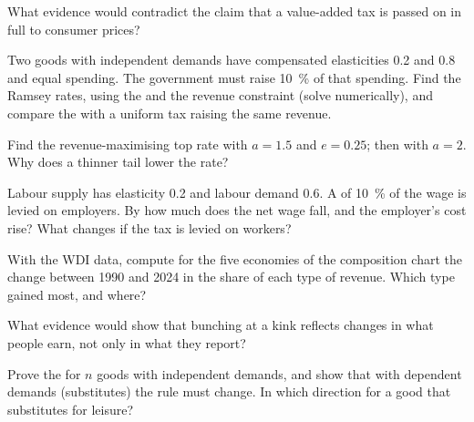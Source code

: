 \begin{exercise}[$\star$]\label{exo:b3:efficiency-cost-of-taxation:4}
What evidence would contradict the claim that a value-added tax is passed on in
full to consumer prices?
\end{exercise}

\begin{exercise}[$\star\star$]\label{exo:b3:efficiency-cost-of-taxation:5}
Two goods with independent demands have compensated elasticities 0.2 and 0.8 and
equal spending. The government must raise 10~\% of that spending. Find the
Ramsey rates, using the  and the revenue constraint
(solve numerically), and compare the  with a uniform tax raising the
same revenue.
\end{exercise}

\begin{exercise}[$\star\star$]\label{exo:b3:efficiency-cost-of-taxation:6}
Find the revenue-maximising top rate with $a = 1.5$ and $e = 0.25$; then with $a = 2$. Why
does a thinner tail lower the rate?
\end{exercise}

\begin{exercise}[$\star\star$]\label{exo:b3:efficiency-cost-of-taxation:7}
Labour supply has elasticity 0.2 and labour demand 0.6. A  of 10~\% of
the wage is levied on employers. By how much does the net wage fall, and the
employer's cost rise? What changes if the tax is levied on workers?
\end{exercise}

\begin{exercise}[$\star\star$]\label{exo:b3:efficiency-cost-of-taxation:8}
With the WDI data, compute for the five economies of the composition chart the
change between 1990 and 2024 in the share of each type of revenue. Which type gained
most, and where?
\end{exercise}

\begin{exercise}[$\star\star$]\label{exo:b3:efficiency-cost-of-taxation:9}
What evidence would show that bunching at a kink reflects changes in what people
earn, not only in what they report?
\end{exercise}

\begin{exercise}[$\star\star\star$]\label{exo:b3:efficiency-cost-of-taxation:10}
Prove the  for $n$ goods with independent demands, and show
that with dependent demands (substitutes) the rule must change. In which direction
for a good that substitutes for leisure?
\end{exercise}

